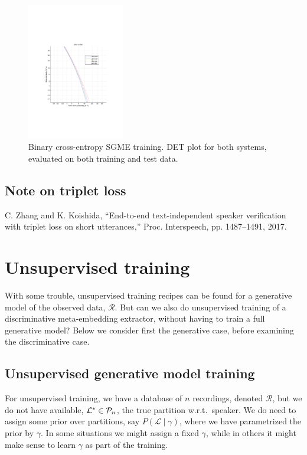 \documentclass[a4paper,oneside,12pt,english]{report}
\def\Lset{\mathcal{L}}
\def\Rset{\mathcal{R}}
\begin{document}
\begin{figure}[htb!]
\centering
\includegraphics[height=6cm,trim={0cm 7cm 1.5cm 8cm},clip]{SGME_BXE_training_DET_plot.pdf}        
\caption[Binary cross-entropy SGME training DET]{Binary cross-entropy SGME training. DET plot for both systems, evaluated on both training and test data.} 
\label{fig:SGME_BXE_Train_DET}
\end{figure}









\section{Note on triplet loss}
C. Zhang and K. Koishida, “End-to-end text-independent
speaker verification with triplet loss on short utterances,” Proc.
Interspeech, pp. 1487–1491, 2017.


\chapter{Unsupervised training}
With some trouble, unsupervised training recipes can be found for a generative model of the observed data, $\Rset$. But can we also do unsupervised training of a discriminative meta-embedding extractor, without having to train a full generative model? Below we consider first the generative case, before examining the discriminative case.

\section{Unsupervised generative model training}
For unsupervised training, we have a database of $n$ recordings, denoted $\Rset$, but we do not have available, $\Lset^*\in\Pset_n$, the true partition w.r.t.\ speaker. We do need to assign some prior over partitions, say $P(\Lset\mid\gamma)$, where we have parametrized the prior by $\gamma$. In some situations we might assign a fixed $\gamma$, while in others it might make sense to learn $\gamma$ as part of the training.
\end{document}
